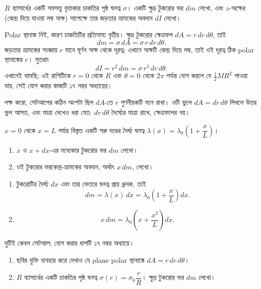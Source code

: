 \documentclass[11pt]{article}
\begin{document}
\begin{example}
$R$ ব্যাসার্ধের একটি সমসত্ত্ব বৃত্তাকার চাকতির পৃষ্ঠ ঘনত্ব $\sigma$। একটি
ক্ষুদ্র টুকরোর ভর $dm$ লেখো, এবং $z$-অক্ষের (কেন্দ্র দিয়ে যাওয়া লম্ব অক্ষ)
সাপেক্ষে তার জড়তার ভ্রামকের অবদান $dI$ লেখো।
\end{example}

\begin{solbox}
Polar স্থানাঙ্ক নিই, কারণ চাকতিটির প্রতিসাম্য বৃত্তীয়। ক্ষুদ্র টুকরোর
ক্ষেত্রফল $dA = r\,dr\,d\theta$, তাই
\[
  dm = \sigma\,dA = \sigma\,r\,dr\,d\theta .
\]
জড়তার ভ্রামকের সংজ্ঞায় $r$ মানে ঘূর্ণন অক্ষ থেকে দূরত্ব; এখানে অক্ষটি
কেন্দ্র দিয়ে লম্ব, তাই ওই দূরত্ব ঠিক polar স্থানাঙ্কের $r$। সুতরাং
\[
  dI = r^{2}\,dm = \sigma\,r^{3}\,dr\,d\theta .
\]
এখানেই থামছি; এই রাশিটিকে $r = 0$ থেকে $R$ এবং $\theta = 0$ থেকে $2\pi$
পর্যন্ত যোগ করলে যে $\tfrac{1}{2}MR^{2}$ পাওয়া যায়, সেই যোগ করার কাজটি
১৭ নম্বর অধ্যায়ের।

লক্ষ করো, সেটআপের কঠিন অংশটা ছিল $dA$-তে $r$ গুণনীয়কটি মনে রাখা। ওটি ভুলে
$dA = dr\,d\theta$ লিখলে উত্তর ভুল আসত, এবং মাত্রা দেখেও ধরা যেত: $dr\,d\theta$
দৈর্ঘ্যের মাত্রা রাখে, ক্ষেত্রফলের নয়।
\end{solbox}

 $x = 0$ থেকে $x = L$ পর্যন্ত বিস্তৃত একটি সরু দণ্ডের দৈর্ঘ্য ঘনত্ব
$\lambda(x) = \lambda_{0}\left( 1 + \dfrac{x}{L} \right)$।
\begin{enumerate}
  \item $x$ ও $x+dx$-এর মধ্যেকার টুকরোর ভর $dm$ লেখো।
  \item ওই টুকরোর ভরকেন্দ্র-ভ্রামকের অবদান, অর্থাৎ $x\,dm$, লেখো।
\end{enumerate}

\begin{sol}
\begin{enumerate}
  \item টুকরোটির দৈর্ঘ্য $dx$ এবং তার ভেতরে ঘনত্ব প্রায় ধ্রুবক, তাই
        \[
          dm = \lambda(x)\,dx
             = \lambda_{0}\left( 1 + \frac{x}{L} \right)dx .
        \]
  \item \[
          x\,dm = \lambda_{0}\left( x + \frac{x^{2}}{L} \right)dx .
        \]
\end{enumerate}
দুটিই কেবল সেটআপ; যোগ করার ধাপটি ১৭ নম্বর অধ্যায়ে।
\end{sol}

 \begin{enumerate}
  \item ছবির যুক্তি ব্যবহার করে দেখাও যে plane polar স্থানাঙ্কে
        $dA = r\,dr\,d\theta$।
  \item $R$ ব্যাসার্ধের একটি চাকতির পৃষ্ঠ ঘনত্ব $\sigma(r) =
        \sigma_{0}\dfrac{r}{R}$। ক্ষুদ্র টুকরোর ভর $dm$ লেখো।
\end{enumerate}
\end{document}

